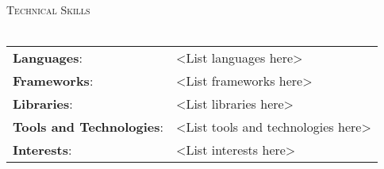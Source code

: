 \documentclass[a4paper]{article}
\newcommand{\lineunder} {
    \vspace*{-8pt} \\
    \hspace*{-18pt} \hrulefill \\
}
\newcommand{\header} [1] {
    {\hspace*{-18pt}\vspace*{6pt} \textsc{#1}}
    \vspace*{-6pt} \lineunder
}
\begin{document}
\header{Technical Skills}
\begin{tabular}{ l l }
    \textbf{Languages}:              & <List languages here>                                      \\
    \textbf{Frameworks}:             & <List frameworks here>                                            \\
    \textbf{Libraries}:              & <List libraries here>                                      \\
    \textbf{Tools and Technologies}: & <List tools and technologies here>                        \\
    \textbf{Interests}:              & <List interests here>                                            \\
\end{tabular}
\vspace{4mm}
\end{document}
